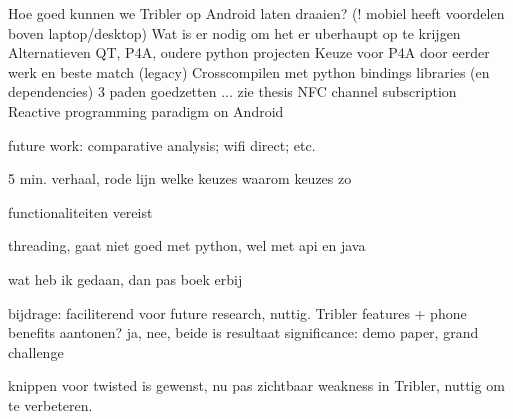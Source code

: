 Hoe goed kunnen we Tribler op Android laten draaien? (! mobiel heeft voordelen boven laptop/desktop)
Wat is er nodig om het er uberhaupt op te krijgen
Alternatieven QT, P4A, oudere python projecten
Keuze voor P4A door eerder werk en beste match (legacy)
Crosscompilen met python bindings libraries (en dependencies)
3 paden goedzetten
... zie thesis
NFC channel subscription
Reactive programming paradigm on Android

future work: comparative analysis; wifi direct; etc.




5 min. verhaal, rode lijn
welke keuzes
waarom keuzes zo

functionaliteiten vereist




threading, gaat niet goed met python, wel met api en java


wat heb ik gedaan, dan pas boek erbij


bijdrage: faciliterend voor future research, nuttig. Tribler features + phone benefits
aantonen? ja, nee, beide is resultaat
significance: demo paper, grand challenge



knippen voor twisted is gewenst, nu pas zichtbaar weakness in Tribler, nuttig om te verbeteren.
